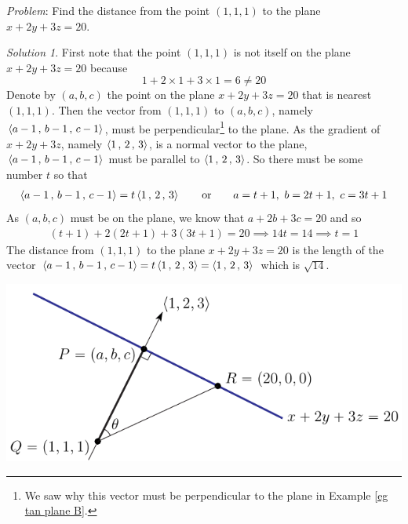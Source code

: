 \begin{eg}\label{eg tan plane G}
\noindent\textit{Problem}:
Find the distance from the point $(1,1,1)$ to the plane
$x+2y+3z=20$.

\medskip
\noindent\textit{Solution 1}. 
First note that the point $(1,1,1)$ is not itself on the plane 
$x+2y+3z=20$ because
\begin{equation*}
1+2\times 1 +3\times 1 =6\ne 20
\end{equation*}
Denote by $(a,b,c)$ the point on the plane $x+2y+3z=20$ that
is nearest $(1,1,1)$. Then the vector from $(1,1,1)$ to $(a,b,c)$,
namely $\left< a-1\,,\,b-1\,,\,c-1\right>$, must be perpendicular\footnote{We
saw why this vector must be perpendicular to the plane in 
Example \ref{eg tan plane B}.} to the plane.
As the gradient of $x+2y+3z$, namely $\left< 1\,,\,2\,,\,3\right>$,
is a normal vector to the plane, $\left< a-1\,,\,b-1\,,\,c-1\right>$
must be parallel to $\left< 1\,,\,2\,,\,3\right>$. So there must be some 
number $t$ so that
\begin{align*}
\left< a-1\,,\,b-1\,,\,c-1\right> = t \left< 1\,,\,2\,,\,3\right>\qquad\text{or}\qquad
a = t+1,\ b=2t+1,\ c=3t+1
\end{align*}
As $(a,b,c)$ must be on the plane, we know that $a+2b+3c=20$ and so
\begin{align*}
(t+1) +2(2t+1) +3(3t+1)=20
\implies 14t = 14
\implies t=1
\end{align*}
The distance from $(1,1,1)$ to the plane $x+2y+3z=20$
is the length of the vector 
  $\left< a-1\,,\,b-1\,,\,c-1\right> = t \left< 1\,,\,2\,,\,3\right>
  = \left< 1\,,\,2\,,\,3\right>$
which is $\sqrt{14}$.

\begin{efig}
\begin{center}
   \includegraphics{distanceSideC.pdf}
\end{center}
\end{efig}




\end{eg}
